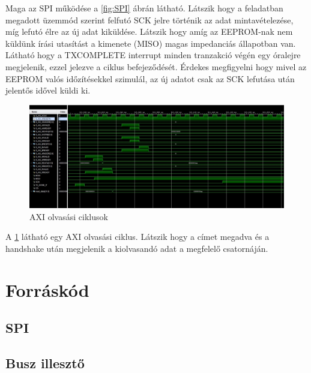 \documentclass[a4paper,11pt]{article}
\begin{document}
Maga az SPI működése a \ref{fig:SPI} ábrán látható. Látszik hogy a feladatban megadott üzemmód szerint felfutó SCK jelre történik az adat mintavételezése, míg lefutó élre az új adat kiküldése. Látszik hogy amíg az EEPROM-nak nem küldünk írási utasítást a kimenete (MISO) magas impedanciás állapotban van. Látható hogy a TXCOMPLETE interrupt minden tranzakció végén egy óralejre megjelenik, ezzel jelezve a ciklus befejeződését. Érdekes megfigyelni hogy mivel az EEPROM valós időzítésekkel szimulál, az új adatot csak az SCK lefutása után jelentős idővel küldi ki.

\begin{figure}[h!]
	\begin{center}
	\includegraphics[scale=0.49]{axi_read.JPG}
	\caption{AXI olvasási ciklusok}
	\label{fig:axi_read}
	\end{center}
	
\end{figure}

A \ref{fig:axi_read} látható egy AXI olvasási ciklus. Látszik hogy a címet megadva és a handshake után megjelenik a kiolvasandó adat a megfelelő csatornáján.


\section{Forráskód}

\subsection{SPI}



\subsection{Busz illesztő}
\end{document}
